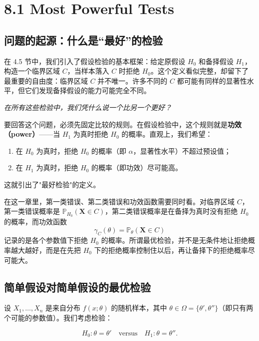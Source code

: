 \section{8.1 Most Powerful Tests}\label{sec:8.1}

\subsection{问题的起源：什么是``最好''的检验}

在 4.5 节中，我们引入了假设检验的基本框架：给定原假设 $H_0$ 和备择假设 $H_1$，构造一个临界区域 $C$，当样本落入 $C$ 时拒绝 $H_0$。这个定义看似完整，却留下了最重要的自由度：临界区域 $C$ 并不唯一。许多不同的 $C$ 都可能有同样的显著性水平，但它们发现备择假设的能力可能完全不同。

\begin{center}
\textit{在所有这些检验中，我们凭什么说一个比另一个更好？}
\end{center}

要回答这个问题，必须先固定比较的规则。在假设检验中，这个规则就是\textbf{功效（power）}——当 $H_1$ 为真时拒绝 $H_0$ 的概率。直观上，我们希望：

\begin{enumerate}
\item 在 $H_0$ 为真时，拒绝 $H_0$ 的概率（即 $\alpha$，显著性水平）不超过预设值；
\item 在 $H_1$ 为真时，拒绝 $H_0$ 的概率（即功效）尽可能高。
\end{enumerate}

这就引出了"最好检验"的定义。

在这一章里，第一类错误、第二类错误和功效函数需要同时看。对临界区域 $C$，第一类错误概率是 $\mathbb{P}_{H_0}(\mathbf{X}\in C)$，第二类错误概率是在备择为真时没有拒绝 $H_0$ 的概率，而功效函数
\[
\gamma_C(\theta)=\mathbb{P}_{\theta}(\mathbf{X}\in C)
\]
记录的是各个参数值下拒绝 $H_0$ 的概率。所谓最优检验，并不是无条件地让拒绝概率越大越好，而是在先把 $H_0$ 下的拒绝概率控制住以后，再让备择下的拒绝概率尽可能大。

\subsection{简单假设对简单假设的最优检验}

设 $X_1, \ldots, X_n$ 是来自分布 $f(x;\theta)$ 的随机样本，其中 $\theta \in \Omega = \{\theta', \theta''\}$（即只有两个可能的参数值）。我们考虑检验：

\[
H_0: \theta = \theta' \quad \text{versus} \quad H_1: \theta = \theta''. \label{eq:simple-vs-simple}
\]

